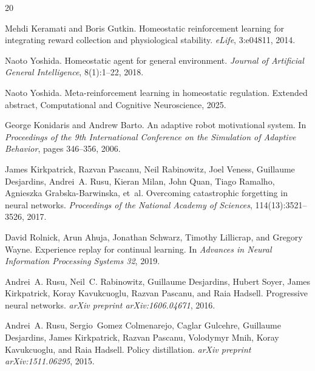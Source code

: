 \documentclass{article}
\begin{document}

\begin{thebibliography}{20}

Mehdi Keramati and Boris Gutkin.
\newblock Homeostatic reinforcement learning for integrating reward collection
  and physiological stability.
\newblock \emph{eLife}, 3:e04811, 2014.

Naoto Yoshida.
\newblock Homeostatic agent for general environment.
\newblock \emph{Journal of Artificial General Intelligence}, 8(1):1--22, 2018.

Naoto Yoshida.
\newblock Meta-reinforcement learning in homeostatic regulation.
\newblock Extended abstract, Computational and Cognitive Neuroscience, 2025.

George Konidaris and Andrew Barto.
\newblock An adaptive robot motivational system.
\newblock In \emph{Proceedings of the 9th International Conference on the
  Simulation of Adaptive Behavior}, pages 346--356, 2006.

James Kirkpatrick, Razvan Pascanu, Neil Rabinowitz, Joel Veness, Guillaume
  Desjardins, Andrei~A. Rusu, Kieran Milan, John Quan, Tiago Ramalho,
  Agnieszka Grabska-Barwinska, et~al.
\newblock Overcoming catastrophic forgetting in neural networks.
\newblock \emph{Proceedings of the National Academy of Sciences},
  114(13):3521--3526, 2017.

David Rolnick, Arun Ahuja, Jonathan Schwarz, Timothy Lillicrap, and Gregory
  Wayne.
\newblock Experience replay for continual learning.
\newblock In \emph{Advances in Neural Information Processing Systems 32}, 2019.

Andrei~A. Rusu, Neil~C. Rabinowitz, Guillaume Desjardins, Hubert Soyer, James
  Kirkpatrick, Koray Kavukcuoglu, Razvan Pascanu, and Raia Hadsell.
\newblock Progressive neural networks.
\newblock \emph{arXiv preprint arXiv:1606.04671}, 2016.

Andrei~A. Rusu, Sergio~Gomez Colmenarejo, Caglar Gulcehre, Guillaume
  Desjardins, James Kirkpatrick, Razvan Pascanu, Volodymyr Mnih, Koray
  Kavukcuoglu, and Raia Hadsell.
\newblock Policy distillation.
\newblock \emph{arXiv preprint arXiv:1511.06295}, 2015.


\end{thebibliography}
\end{document}
